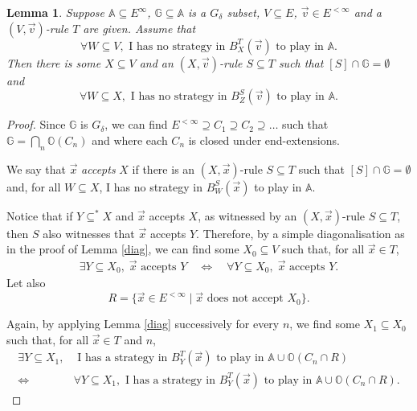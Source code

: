 \documentclass[10pt]{amsart}
\newcommand {\A}{\mathbb A}
\newcommand{\G}{\mathbb G}
\newcommand {\OO}{\mathbb O}
\newcommand{\tom} {\emptyset}
\newcommand{\equi}{\Longleftrightarrow}
\newcommand {\del}{ \; \big| \;}
\newcommand {\e} {\exists}
\renewcommand {\a} {\forall}
\newtheorem{lemme}[thm]{Lemma}
\theoremstyle{definition}
\begin{document}
\begin{lemme}\label{davis2}
Suppose $\A\subseteq E^\infty$, $\G\subseteq \A$ is a $G_\delta$ subset, $V\subseteq E$, $\vec v\in E^{<\infty}$ and a $(V,\vec v)$-rule $T$ are given. 
Assume that 
$$
\a W\subseteq V, \text{ I has no strategy in $B^T_X(\vec v)$ to play in $\A$.}
$$
Then there is some $X\subseteq V$ and an $(X,\vec v)$-rule $S\subseteq T$  such that $ [S]\cap \G=\tom$ and
$$
\a W\subseteq X,  \text{  I has no strategy in $B_Z^S(\vec v)$ to play in $\A$.}
$$
\end{lemme}







\begin{proof}Since $\G$ is $G_\delta$, we can find $E^{<\infty}\supseteq C_1\supseteq C_2\supseteq\ldots$ such that $\G=\bigcap_n\OO(C_n)$ and where each $C_n$ is closed under end-extensions. 


We say that $\vec x$ {\em accepts} $X$ if there is an $(X,\vec x)$-rule $S\subseteq T$ such that $[S]\cap \G=\tom$ and, for all $W\subseteq X$,  I has no strategy in $B^S_W(\vec x)$ to play in $\A$.



Notice that if $Y\subseteq^* X$ and $\vec x$ accepts $X$, as witnessed by an $(X,\vec x)$-rule $S\subseteq T$, then $S$ also witnesses that $\vec x$  accepts $Y$. Therefore, by a simple diagonalisation as in the proof of Lemma \ref{diag}, we can find some $X_0\subseteq V$ such that, for all $\vec x\in T$, 
\begin{equation}\label{x}\begin{split}
\e Y\subseteq X_0, \;\vec x \text{ accepts }Y\quad
\equi\quad
\a Y\subseteq X_0, \;\vec x \text{ accepts }Y.
\end{split}\end{equation}
Let also 
$$
R=\{\vec x\in E^{<\infty}\del  \vec x \text{ does not accept }X_0\}.
$$

Again, by applying Lemma \ref{diag} successively for every $n$,  we find some $X_1\subseteq X_0$ such that,  for all $\vec x\in T$ and $n$,
\begin{equation}\label{xx}\begin{split}
\e Y\subseteq X_1,& \text{  I has a strategy in $B^T_Y(\vec x)$ to play in $\A\cup \OO(C_{n}\cap R)$}\\
\equi\;\;
&\a Y\subseteq X_1, \text{  I has a strategy in $B^T_Y(\vec x)$ to play in $\A\cup \OO(C_{n}\cap R)$}.
\end{split}\end{equation}





\end{proof}
\end{document}
